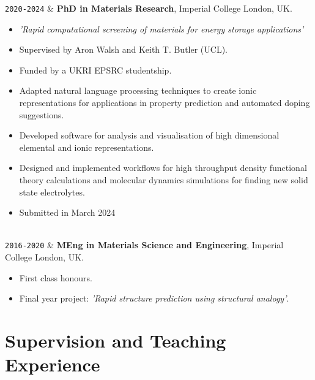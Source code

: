 \documentclass[11pt,a4paper]{article}
\newcommand{\ICL}{Imperial College London}
\newcommand{\Duration}[2]{\fontsize{10pt}{0}\selectfont \texttt{#1-#2}}
\begin{document}
\begin{EntriesTableDuration}
  \Duration{2020}{2024}  &
  \textbf{PhD in Materials Research}, \ICL{}, UK.
  \begin{itemize}
    \item \textit{'Rapid computational screening of materials for energy storage applications'}
    \item Supervised by Aron Walsh and Keith T. Butler (UCL).
    \item Funded by a UKRI EPSRC studentship.
    \item Adapted natural language processing techniques to create ionic representations for applications in property prediction and automated doping suggestions.
    \item Developed software for analysis and visualisation of high dimensional elemental and ionic representations.
    \item Designed and implemented workflows for high throughput density functional theory calculations and molecular dynamics simulations for finding new solid state electrolytes.
    \item Submitted in March 2024
  \end{itemize}
  \\
  \Duration{2016}{2020}  &
  \textbf{MEng in Materials Science and Engineering}, \ICL{}, UK.
  \begin{itemize}
    \item First class honours.
    \item Final year project: \textit{'Rapid structure prediction using structural analogy'}.
  \end{itemize}
\end{EntriesTableDuration}

\section{Supervision and Teaching Experience}
\end{document}
